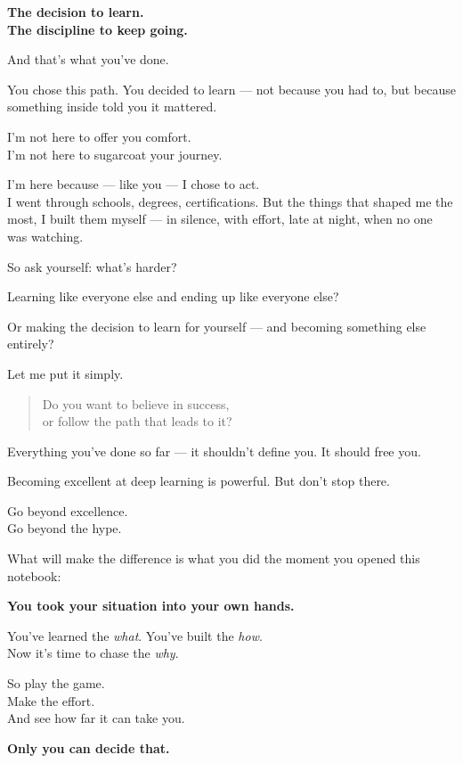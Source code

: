 \documentclass[11pt]{article}
\begin{document}
\begin{center}
\textbf{The decision to learn.\\
The discipline to keep going.}
\end{center}

And that’s what you’ve done.

You chose this path. You decided to learn — not because you had to, but because something inside told you it mattered.

\medskip

\noindent
I'm not here to offer you comfort.\\
I'm not here to sugarcoat your journey.

I'm here because — like you — I chose to act.\\
I went through schools, degrees, certifications. But the things that shaped me the most, I built them myself — in silence, with effort, late at night, when no one was watching.

\medskip

So ask yourself: what's harder?

Learning like everyone else and ending up like everyone else?

Or making the decision to learn for yourself — and becoming something else entirely?

\bigskip

\noindent
Let me put it simply.

\begin{quote}
Do you want to believe in success,\\
or follow the path that leads to it?
\end{quote}

\medskip

Everything you've done so far — it shouldn't define you. It should free you.

Becoming excellent at deep learning is powerful. But don’t stop there.

\medskip

\noindent
Go beyond excellence.\\
Go beyond the hype.

What will make the difference is what you did the moment you opened this notebook:

\begin{center}
\textbf{You took your situation into your own hands.}
\end{center}

\medskip

You’ve learned the \textit{what}. You’ve built the \textit{how}.\\
Now it’s time to chase the \textit{why}.

\bigskip

\noindent
So play the game.\\
Make the effort.\\
And see how far it can take you.

\bigskip

\begin{center}
\Huge\textbf{Only you can decide that.}
\end{center}
\end{document}
